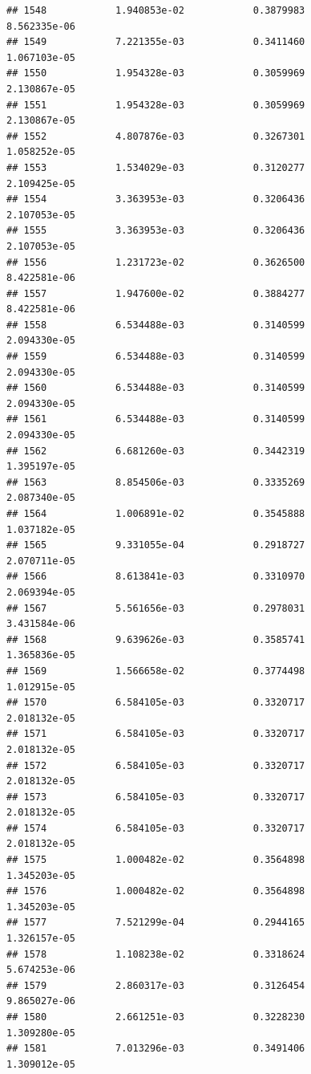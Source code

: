 \documentclass[
]{article}
\begin{document}
\begin{verbatim}
## 1548            1.940853e-02            0.3879983            8.562335e-06
## 1549            7.221355e-03            0.3411460            1.067103e-05
## 1550            1.954328e-03            0.3059969            2.130867e-05
## 1551            1.954328e-03            0.3059969            2.130867e-05
## 1552            4.807876e-03            0.3267301            1.058252e-05
## 1553            1.534029e-03            0.3120277            2.109425e-05
## 1554            3.363953e-03            0.3206436            2.107053e-05
## 1555            3.363953e-03            0.3206436            2.107053e-05
## 1556            1.231723e-02            0.3626500            8.422581e-06
## 1557            1.947600e-02            0.3884277            8.422581e-06
## 1558            6.534488e-03            0.3140599            2.094330e-05
## 1559            6.534488e-03            0.3140599            2.094330e-05
## 1560            6.534488e-03            0.3140599            2.094330e-05
## 1561            6.534488e-03            0.3140599            2.094330e-05
## 1562            6.681260e-03            0.3442319            1.395197e-05
## 1563            8.854506e-03            0.3335269            2.087340e-05
## 1564            1.006891e-02            0.3545888            1.037182e-05
## 1565            9.331055e-04            0.2918727            2.070711e-05
## 1566            8.613841e-03            0.3310970            2.069394e-05
## 1567            5.561656e-03            0.2978031            3.431584e-06
## 1568            9.639626e-03            0.3585741            1.365836e-05
## 1569            1.566658e-02            0.3774498            1.012915e-05
## 1570            6.584105e-03            0.3320717            2.018132e-05
## 1571            6.584105e-03            0.3320717            2.018132e-05
## 1572            6.584105e-03            0.3320717            2.018132e-05
## 1573            6.584105e-03            0.3320717            2.018132e-05
## 1574            6.584105e-03            0.3320717            2.018132e-05
## 1575            1.000482e-02            0.3564898            1.345203e-05
## 1576            1.000482e-02            0.3564898            1.345203e-05
## 1577            7.521299e-04            0.2944165            1.326157e-05
## 1578            1.108238e-02            0.3318624            5.674253e-06
## 1579            2.860317e-03            0.3126454            9.865027e-06
## 1580            2.661251e-03            0.3228230            1.309280e-05
## 1581            7.013296e-03            0.3491406            1.309012e-05

\end{verbatim}
\end{document}
